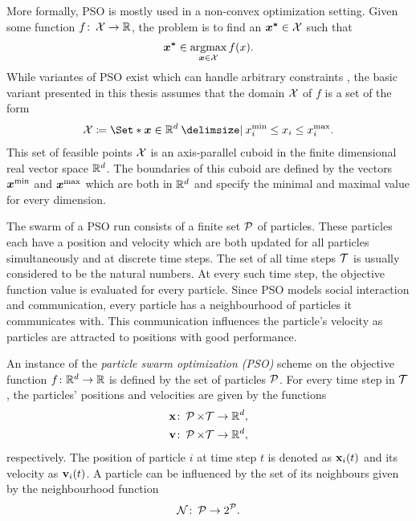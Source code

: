 More formally, PSO is mostly used in a non-convex optimization setting.
Given some function $f \colon \operatorname{\mathcal{X}} \to \mathbb{R}$, the problem is to find an $\bm{x^\ast} \in \operatorname{\mathcal{X}}$ such that
\begin{align}
    \bm{x^\ast} \in \operatorname*{argmax}_{\bm{x} \in \operatorname{\mathcal{X}}} f(x).
\end{align}
While variantes of PSO exist which can handle arbitrary constraints \cite{engelbrecht_fundamentals_2006}, the basic variant presented in this thesis assumes that the domain $\operatorname{\mathcal{X}}$ of $f$ is a set of the form
\begin{align}
    \X \coloneqq \Set*{\mat{x} \in \R^d \with x^{\text{min}}_i \leq x_i \leq x^{\text{max}}_i}.
\end{align}
This set of feasible points $\operatorname{\mathcal{X}}$ is an axis-parallel cuboid in the finite dimensional real vector space $\mathbb{R}^d$.
The boundaries of this cuboid are defined by the vectors $\bm{x^{\text{min}}}$ and $\bm{x^{\text{max}}}$ which are both in $\mathbb{R}^d$ and specify the minimal and maximal value for every dimension.

The swarm of a PSO run consists of a finite set $\operatorname{\mathcal{P}}$ of particles.
These particles each have a position and velocity which are both updated for all particles simultaneously and at discrete time steps.
The set of all time steps $\mathcal{T}$ is usually considered to be the natural numbers.
At every such time step, the objective function value is evaluated for every particle.
Since PSO models social interaction and communication, every particle has a neighbourhood of particles it communicates with.
This communication influences the particle's velocity as particles are  attracted to positions with good performance.
\begin{definition}
    An instance of the \emph{particle swarm optimization (PSO)} scheme on the objective function $f \colon \mathbb{R}^d \to \mathbb{R}$ is defined by the set of particles $\operatorname{\mathcal{P}}$.
    For every time step in $\mathcal{T}$, the particles' positions and velocities are given by the functions
    \begin{align}
        \operatorname{\mathbf{x}} &\colon \operatorname{\mathcal{P}} \times \mathcal{T} \to \mathbb{R}^d, \\
        \operatorname{\mathbf{v}} &\colon \operatorname{\mathcal{P}} \times \mathcal{T} \to \mathbb{R}^d,
    \end{align}
    respectively. The position of particle $i$ at time step $t$ is denoted as $\operatorname{\mathbf{x}}_i(t)$ and its velocity as $\operatorname{\mathbf{v}}_i(t)$. A particle can be influenced by the set of its neighbours given by the neighbourhood function
    \begin{align}
        \operatorname{\mathcal{N}} \colon \operatorname{\mathcal{P}} \to 2^{\operatorname{\mathcal{P}}}.
    \end{align}
\end{definition}

